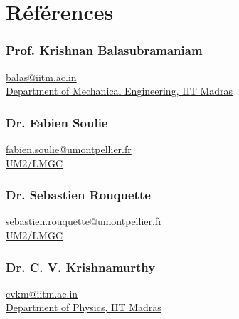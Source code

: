 \documentclass{my_cv}%
\begin{document}
\section{Références}
\vspace{1em}
\begin{minipage}{0.6\textwidth}
\subsubsection{Prof. Krishnan Balasubramaniam} 
\faAt \hspace{0.2em} \href{mailto:balas@iitm.ac.in}{balas@iitm.ac.in} \\
\hspace{0.5em} \faInstitution \hspace{0.2em} \href{http://iitm.irins.org/profile/50968}{Department of Mechanical Engineering, IIT Madras}
\vspace{1.5em}
\subsubsection{Dr. Fabien Soulie} 
\faAt \hspace{0.2em} \href{mailto:fabien.soulie@umontpellier.fr}{fabien.soulie@umontpellier.fr}\\ \hspace{0.2em}\faInstitution \hspace{0.2em}  \href{http://www.lmgc.univ-montp2.fr/spip.php?page=pageperso&nom=SOULIE&prenom=Fabien&lang=fr}{UM2/LMGC}
\vspace{1em}
\end{minipage}
\begin{minipage}{0.6\textwidth}
\subsubsection{Dr. Sebastien Rouquette} 
\faAt \hspace{0.2em} \href{mailto:sebastien.rouquette@umontpellier.fr}{sebastien.rouquette@umontpellier.fr}\\ \faInstitution \hspace{0.2em} \href{http://www.lmgc.univ-montp2.fr/spip.php?page=pageperso&nom=ROUQUETTE&prenom=Sebastien&lang=fr}{UM2/LMGC}
\vspace{1.2em}
\subsubsection{Dr. C. V. Krishnamurthy} 
\faAt \hspace{0.2em} \href{mailto:cvkm@iitm.ac.in}{cvkm@iitm.ac.in} \\
\faInstitution \hspace{0.2em} \href{http://iitm.irins.org/profile/61936}{Department of Physics, IIT Madras}
\end{minipage}
\end{document}
